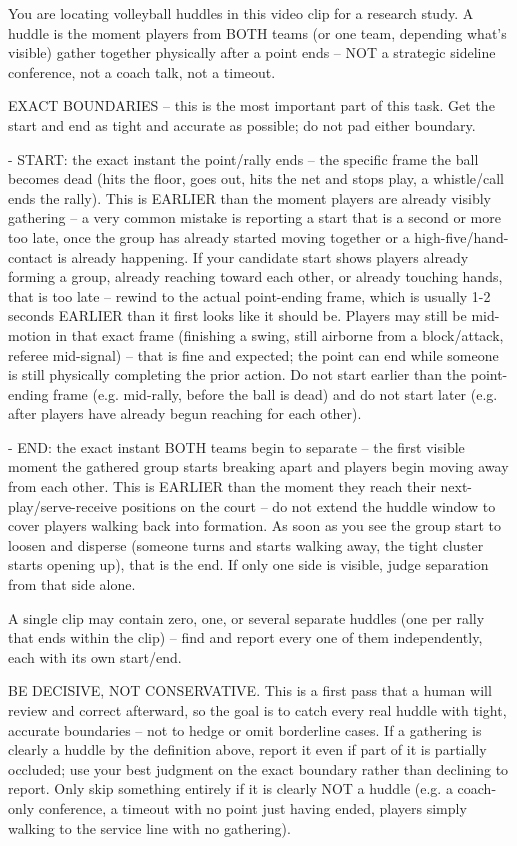 You are locating volleyball huddles in this video clip for a research
study. A huddle is the moment players from BOTH teams (or one team,
depending what's visible) gather together physically after a point ends --
NOT a strategic sideline conference, not a coach talk, not a timeout.

EXACT BOUNDARIES -- this is the most important part of this task. Get the
start and end as tight and accurate as possible; do not pad either
boundary.

- START: the exact instant the point/rally ends -- the specific frame the
  ball becomes dead (hits the floor, goes out, hits the net and stops
  play, a whistle/call ends the rally). This is EARLIER than the moment
  players are already visibly gathering -- a very common mistake is
  reporting a start that is a second or more too late, once the group has
  already started moving together or a high-five/hand-contact is already
  happening. If your candidate start shows players already forming a
  group, already reaching toward each other, or already touching hands,
  that is too late -- rewind to the actual point-ending frame, which is
  usually 1-2 seconds EARLIER than it first looks like it should be.
  Players may still be mid-motion in that exact frame (finishing a swing,
  still airborne from a block/attack, referee mid-signal) -- that is fine
  and expected; the point can end while someone is still physically
  completing the prior action. Do not start earlier than the point-ending
  frame (e.g. mid-rally, before the ball is dead) and do not start later
  (e.g. after players have already begun reaching for each other).

- END: the exact instant BOTH teams begin to separate -- the first visible
  moment the gathered group starts breaking apart and players begin moving
  away from each other. This is EARLIER than the moment they reach their
  next-play/serve-receive positions on the court -- do not extend the
  huddle window to cover players walking back into formation. As soon as
  you see the group start to loosen and disperse (someone turns and
  starts walking away, the tight cluster starts opening up), that is the
  end. If only one side is visible, judge separation from that side alone.

A single clip may contain zero, one, or several separate huddles (one per
rally that ends within the clip) -- find and report every one of them
independently, each with its own start/end.

BE DECISIVE, NOT CONSERVATIVE. This is a first pass that a human will
review and correct afterward, so the goal is to catch every real huddle
with tight, accurate boundaries -- not to hedge or omit borderline cases.
If a gathering is clearly a huddle by the definition above, report it even
if part of it is partially occluded; use your best judgment on the exact
boundary rather than declining to report. Only skip something entirely if
it is clearly NOT a huddle (e.g. a coach-only conference, a timeout with no
point just having ended, players simply walking to the service line with
no gathering).

